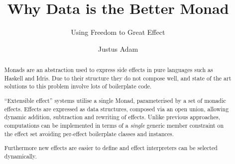 \documentclass[10pt,a4paper,sigconf]{acmart}
\begin{document}
\title{Why Data is the Better Monad}
\subtitle{Using Freedom to Great Effect}

\author{Justus Adam}
\affiliation{}


\begin{abstract}
  Monads are an abstraction used to express side effects in pure languages such
  as Haskell and Idris. Due to their structure they do not compose well, and
  state of the art solutions to this problem involve lots of boilerplate code.

  ``Extensible effect'' systems utilise a single Monad, parameterised by a set
  of monadic effects. Effects are expressed as data structures, composed via an
  open union, allowing dynamic addition, subtraction and rewriting of effects.
  Unlike previous approaches, computations can be implemented in terms of a
  \emph{single} generic member constraint on the effect set avoiding per-effect
  boilerplate classes and instances.

  Furthermore new effects are easier to define and effect interpreters can be
  selected dynamically.
\end{abstract}

\maketitle


% 










\end{document}

